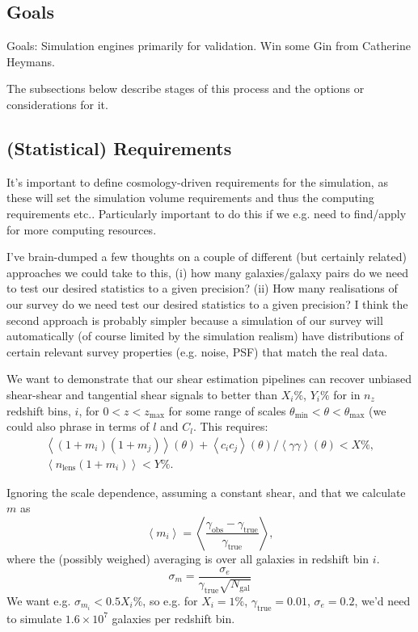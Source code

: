 \documentclass[\docopts]{\docclass}
\begin{document}
\subsection{Goals}
Goals: Simulation engines primarily for validation. Win some Gin from Catherine Heymans.

The subsections below describe stages of this process and the options or considerations for it.

\subsection{(Statistical) Requirements}

It's important to define cosmology-driven requirements for the simulation, as these will set the simulation volume requirements and thus the computing requirements etc.. Particularly important to do this if we e.g. need to find/apply for more computing resources.

I've brain-dumped a few thoughts on a couple of different (but certainly related) approaches we could take to this, (i) how many galaxies/galaxy pairs do we need to test our desired statistics to a given precision? (ii) How many realisations of our survey do we need test our desired statistics to a given precision? I think the second approach is probably simpler because a simulation of our survey will automatically (of course limited by the simulation realism) have distributions of certain relevant survey properties (e.g. noise, PSF) that match the real data. 

We want to demonstrate that our shear estimation pipelines can recover unbiased shear-shear and tangential shear signals to better than $X_i\%$, $Y_i\%$  for in $n_z$ redshift bins, $i$, for $0<z<z_{\mathrm{max}}$ for some range of scales $\theta_{\mathrm{min}} < \theta < \theta_{\mathrm{max}}$ (we could also phrase in terms of $l$ and $C_l$. This requires:
\begin{align}
\left<(1+m_i)(1+m_j)\right>(\theta) + \left<c_i c_j\right>(\theta)/\left<\gamma \gamma\right>(\theta) < X\%, \\ 
\left<n_{\mathrm{lens}}(1+m_i)\right> < Y\%.
\end{align}

Ignoring the scale dependence, assuming a constant shear, and that we calculate $m$ as
\begin{equation}
\left<m_i\right> = \left<\frac{\gamma_{\mathrm{obs}}-\gamma_{\mathrm{true}}}{\gamma_{\mathrm{true}}}\right>,
\end{equation}
where the (possibly weighed) averaging is over all galaxies in redshift bin $i$.
\begin{equation}
\sigma_m = \frac{\sigma_e}{\gamma_{\mathrm{true}} \sqrt{N_{\mathrm{gal}}}}
\end{equation}
We want e.g. $\sigma_{m_i} < 0.5 X_i\%$, so e.g. for $X_i = 1\%$, $\gamma_{\mathrm{true}}=0.01$, $\sigma_e = 0.2$, we'd need to simulate $1.6\times10^7$ galaxies per redshift bin.
\end{document}

